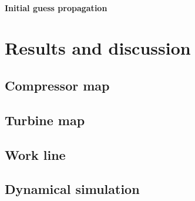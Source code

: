 \documentclass[tcc]{subfiles}
\begin{document}
\subsubsection{Initial guess propagation}

\chapter{Results and discussion}
\section{Compressor map}
\section{Turbine map}
\section{Work line}
\section{Dynamical simulation}





\end{document}
